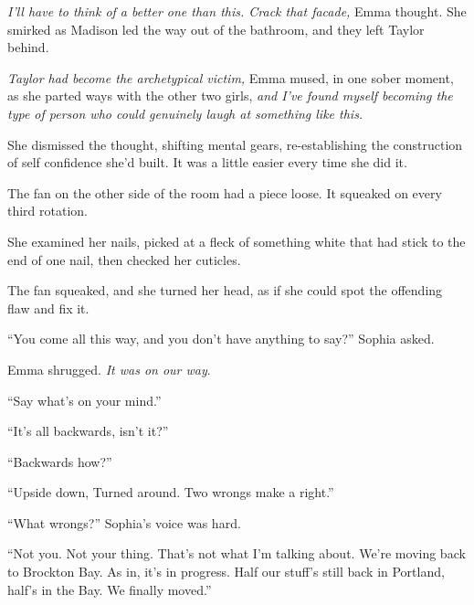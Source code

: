 \emph{I'll have to think of a better one than this.  Crack that facade, }Emma thought.  She smirked as Madison led the way out of the bathroom, and they left Taylor behind.



\emph{Taylor had become the archetypical victim,} Emma mused, in one sober moment, as she parted ways with the other two girls, \emph{and I've found myself becoming the type of person who could genuinely laugh at something like this.}



She dismissed the thought, shifting mental gears, re-establishing the construction of self confidence she'd built.\emph{  }It was a little easier every time she did it.



\blacksquare



The fan on the other side of the room had a piece loose.  It squeaked on every third rotation.



She examined her nails, picked at a fleck of something white that had stick to the end of one nail, then checked her cuticles.



The fan squeaked, and she turned her head, as if she could spot the offending flaw and fix it.



``You come all this way, and you don't have anything to say?''  Sophia asked.



Emma shrugged.  \emph{It was on our way}.



``Say what's on your mind.''



``It's all backwards, isn't it?''



``Backwards how?''



``Upside down, Turned around.  Two wrongs make a right.''



``What wrongs?''  Sophia's voice was hard.



``Not you.  Not your thing.  That's not what I'm talking about.  We're moving back to Brockton Bay.  As in, it's in progress.  Half our stuff's still back in Portland, half's in the Bay.  We finally moved.''



